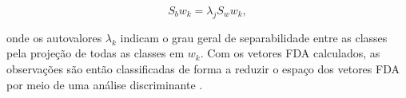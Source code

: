 \begin{equation}
    S_bw_k = \lambda_jS_ww_k,
\end{equation}

\noindent onde os autovalores $\lambda_k$ indicam o grau geral de separabilidade entre as classes pela projeção de todas as classes em $w_k$. Com os vetores FDA calculados, as observações são então classificadas de forma a reduzir o espaço dos vetores FDA por meio de uma análise discriminante \cite{sugiyama2007dimensionality}.



